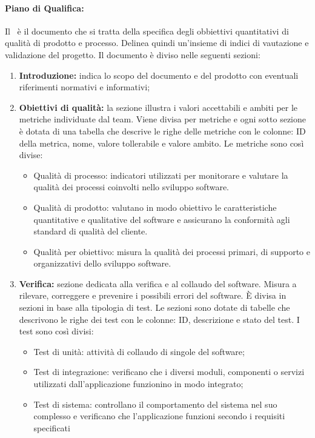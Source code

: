 \paragraph{Piano di Qualifica:}
Il \PdQ\ è il documento che si tratta della specifica degli obbiettivi quantitativi di qualità di prodotto e processo. Delinea quindi un'insieme di indici di vautazione e validazione del progetto.
Il documento è diviso nelle seguenti sezioni:
\begin{enumerate}
  \item \textbf{Introduzione:} indica lo scopo del documento e del prodotto con eventuali riferimenti normativi e informativi;
  \item \textbf{Obiettivi di qualità:} la sezione illustra i valori accettabili e ambiti per le metriche individuate dal team. Viene divisa per metriche e ogni sotto sezione è dotata di una tabella che descrive le righe delle metriche con le colonne: ID della metrica, nome, valore tollerabile e valore ambito. Le metriche sono così divise:
  \begin{itemize}
    \item Qualità di processo: indicatori utilizzati per monitorare e valutare la qualità dei processi coinvolti nello sviluppo software. 
    \item Qualità di prodotto: valutano in modo obiettivo le caratteristiche quantitative e qualitative del software e assicurano la conformità agli standard di qualità del cliente.
    \item Qualità per obiettivo: misura la qualità dei processi primari, di supporto e organizzativi dello sviluppo software.
  \end{itemize}
  \item \textbf{Verifica:} sezione dedicata alla verifica e al collaudo del software. Misura a rilevare, correggere e prevenire i possibili errori del software. È divisa in sezioni in base alla tipologia di test. Le sezioni sono dotate di tabelle che descrivono le righe dei test con le colonne: ID, descrizione e stato del test. I test sono così divisi:
  \begin{itemize}
    \item Test di unità:  attività di collaudo di singole  del software;
    \item Test di integrazione: verificano che i diversi moduli, componenti o servizi utilizzati dall’applicazione funzionino in modo integrato;
    \item Test di sistema:  controllano il comportamento del sistema nel suo complesso e verificano che l’applicazione funzioni secondo i requisiti specificati

\end{itemize}
\end{enumerate}

